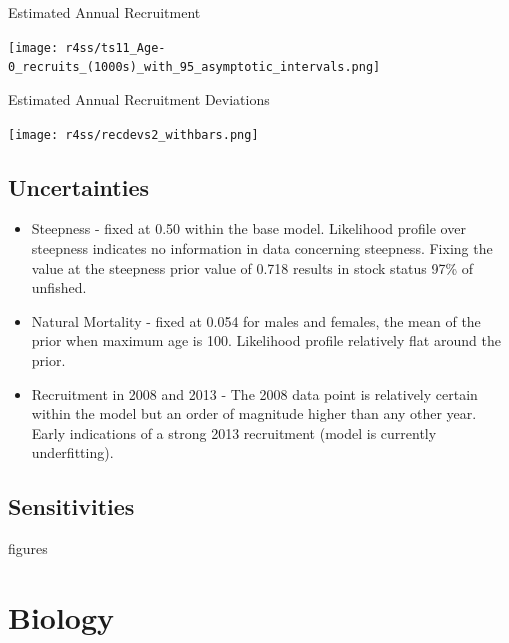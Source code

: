 \documentclass[pdf]{beamer}\usepackage[]{graphicx}\usepackage[]{color}
\begin{document}
\begin{frame}{Estimated Annual Recruitment}
  \begin{center}
    \texttt{[image: r4ss/ts11\_Age-0\_recruits\_(1000s)\_with\_95\_asymptotic\_intervals.png]}
  \end{center}
\end{frame}

\begin{frame}{Estimated Annual Recruitment Deviations}
  \begin{center}
    \texttt{[image: r4ss/recdevs2\_withbars.png]}
  \end{center}
\end{frame}

\subsection{Uncertainties}
\begin{frame}
  \begin{itemize}
    \item Steepness - fixed at 0.50 within the base model.  Likelihood profile over steepness indicates no information in data concerning steepness.  Fixing the value at the steepness prior value of 0.718 results in stock status 97\% of unfished.
    \item Natural Mortality - fixed at 0.054 for males and females, the mean of the prior when maximum age is 100.  Likelihood profile relatively flat around the prior.
    \item Recruitment in 2008 and 2013 - The 2008 data point is relatively certain within the model but an order of magnitude higher than any other year.  Early indications of a strong 2013 recruitment (model is currently underfitting).
  \end{itemize}
\end{frame}

\subsection{Sensitivities}
\begin{frame}
  figures
\end{frame}



\section{Biology}
\end{document}
